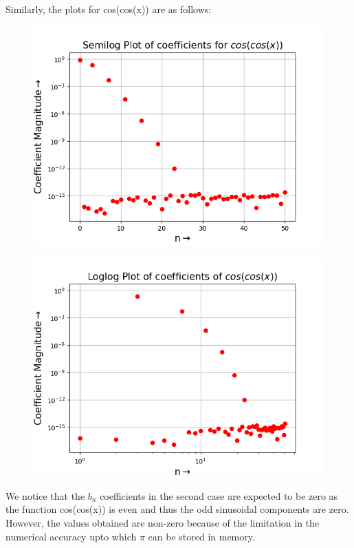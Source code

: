 \documentclass{article}
\begin{document}
\newpage
Similarly, the plots for cos(cos(x)) are as follows:
\begin{figure}[h!]
	\centering
	\includegraphics[scale=0.46]{q3(c)}
	\label{fig:1(b)}
\end{figure}
\begin{figure}[h!]
	\centering
	\includegraphics[scale=0.46]{q3(d)}
	\label{fig:1(b)}
\end{figure}

We notice that the $b_{n}$ coefficients in the second case are expected to be
zero as the function cos(cos(x)) is even and thus the odd sinusoidal components are zero. However, the values obtained are non-zero because of the limitation
in the numerical accuracy upto which $\pi$ can be stored in memory.
\end{document}
